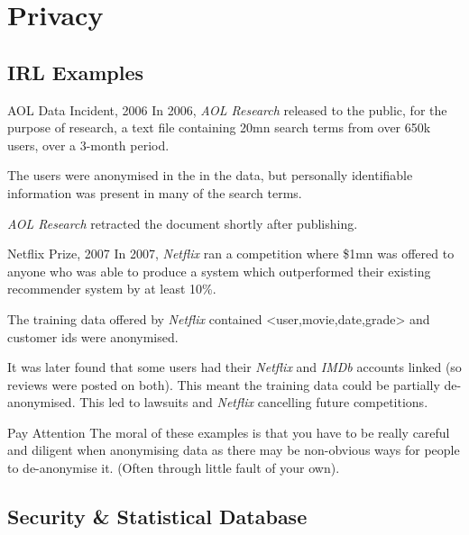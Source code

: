 \documentclass[11pt,a4paper]{article}
\begin{document}
\section{Privacy}\label{sec_privacy}

\subsection{IRL Examples}\label{sec_privacy_examples}

  \begin{remark}{AOL Data Incident, 2006}
    In 2006, \textit{AOL Research} released to the public, for the purpose of research, a text file containing 20mn search terms from over 650k users, over a 3-month period.
    \par The users were anonymised in the in the data, but personally identifiable information was present in many of the search terms.
    \par \textit{AOL Research} retracted the document shortly after publishing.
  \end{remark}

  \begin{remark}{Netflix Prize, 2007}
    In 2007, \textit{Netflix} ran a competition where \$1mn was offered to anyone who was able to produce a system which outperformed their existing recommender system by at least 10\%.
    \par The training data offered by \textit{Netflix} contained <user,movie,date,grade> and customer ids were anonymised.
    \par It was later found that some users had their \textit{Netflix} and \textit{IMDb} accounts linked (so reviews were posted on both). This meant the training data could be partially de-anonymised. This led to lawsuits and \textit{Netflix} cancelling future competitions.
  \end{remark}

  \begin{remark}{Pay Attention}
    The moral of these examples is that you have to be really careful and diligent when anonymising data as there may be non-obvious ways for people to de-anonymise it. (Often through little fault of your own).
  \end{remark}

\subsection{Security \& Statistical Database}\label{sec_security_and_statistical_database}
\end{document}

